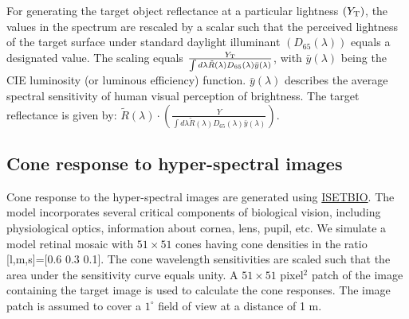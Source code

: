 \documentclass{jov}
\begin{document}
For generating the target object reflectance at a particular lightness $(Y_{\rm T})$, the values in the spectrum are 
rescaled by a scalar such that the perceived lightness of the 
target surface under standard daylight illuminant $(D_{65}(\lambda))$ 
equals a designated value. The scaling equals $\frac{Y_{\rm T}}{\int d\lambda \tilde{R}(\lambda) D_{65}(\lambda) \bar{y}(\lambda)}$, with $\bar{y}(\lambda)$ being the CIE luminosity (or luminous efficiency) function. 
$\bar{y}(\lambda)$ describes the average spectral sensitivity of human visual 
perception of brightness. The target reflectance is given by: $\tilde{R}(\lambda) \cdot\left(\frac{Y}{\int d\lambda \tilde{R}(\lambda) D_{65}(\lambda) \bar{y}(\lambda)}\right)$.

\subsection{Cone response to hyper-spectral images}
Cone response to the hyper-spectral images are generated
using \href{https://github.com/isetbio}{ISETBIO}. The model incorporates several critical components of biological vision, including physiological optics, information about cornea, lens, pupil, etc. We simulate a model retinal mosaic with $51\times51$ cones having cone densities in the ratio [l,m,s]=[0.6 0.3 0.1]. The cone wavelength sensitivities are scaled such that the area under the sensitivity curve equals unity. A $51\times51$ pixel$^2$ patch of the image containing the target image is used to calculate the cone responses. The image patch is assumed to cover a $1^{\circ}$ field of view at a distance of 1 m.



\end{document}
